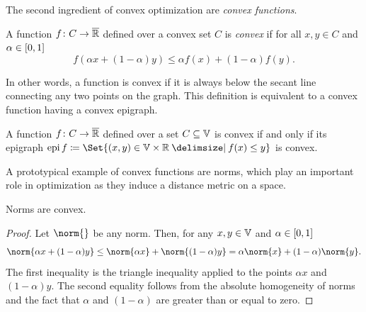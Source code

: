 The second ingredient of convex optimization are \emph{convex functions}.
\begin{definition}%
	\label{def:convex functions zero order}
	A function \( f \colon C \to \overline{\mathbb{R}} \) defined over a convex set \( C \) is \emph{convex} if for all \( x, y \in C \) and \( \alpha \in \interval{0}{1} \)
	\[
		f(\alpha x + (1 - \alpha)y) \leq \alpha f(x) + (1 - \alpha)f(y).
	\]
\end{definition}
In other words, a function is convex if it is always below the secant line connecting any two points on the graph.
This definition is equivalent to a convex function having a convex epigraph.
\begin{theorem}
	A function \( f \colon C \to \overline{\mathbb{R}} \) defined over a set \( C \subseteq \mathbb{V} \) is convex if and only if its epigraph \( \epi f \coloneqq \Set{(x, y) \in \V \times \R \given f(x) \leq y} \) is convex.
\end{theorem}

A prototypical example of convex functions are norms, which play an important role in optimization as they induce a distance metric on a space.
\begin{proposition}
	Norms are convex.
\end{proposition}
\begin{proof}
	Let \( \norm{} \) be any norm.
	Then, for any \( x, y \in \mathbb{V} \) and \( \alpha \in \interval{\num{0}}{\num{1}} \)
	\[
		\norm{\alpha x + (\num{1} - \alpha)y} \leq \norm{\alpha x} + \norm{(1 - \alpha)y} = \alpha\norm{x} + (\num{1} - \alpha)\norm{y}.
	\]
	The first inequality is the triangle inequality applied to the points \( \alpha x \) and \( (\num{1} - \alpha) y \).
	The second equality follows from the absolute homogeneity of norms and the fact that \( \alpha \) and \( (\num{1} - \alpha) \) are greater than or equal to zero.
\end{proof}

